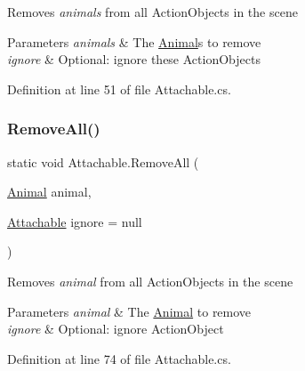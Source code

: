 Removes {\itshape animals}  from all Action\+Objects in the scene 


\begin{DoxyParams}{Parameters}
{\em animals} & The \mbox{\hyperlink{class_animal}{Animal}}s to remove\\
\hline
{\em ignore} & Optional\+: ignore these Action\+Objects\\
\hline
\end{DoxyParams}


Definition at line 51 of file Attachable.\+cs.

\mbox{\label{class_attachable_a2431a3ad3f6a1a2a4d697e6cc661d55c}} 
\subsubsection{\texorpdfstring{Remove\+All()}{RemoveAll()}\hspace{0.1cm}{\footnotesize\ttfamily [2/3]}}
{\footnotesize\ttfamily static void Attachable.\+Remove\+All (\begin{DoxyParamCaption}\item[{\mbox{\hyperlink{class_animal}{Animal}}}]{animal,  }\item[{\mbox{\hyperlink{class_attachable}{Attachable}}}]{ignore = {\ttfamily null} }\end{DoxyParamCaption})\hspace{0.3cm}{\ttfamily [static]}}



Removes {\itshape animal}  from all Action\+Objects in the scene 


\begin{DoxyParams}{Parameters}
{\em animal} & The \mbox{\hyperlink{class_animal}{Animal}} to remove\\
\hline
{\em ignore} & Optional\+: ignore Action\+Object\\
\hline
\end{DoxyParams}


Definition at line 74 of file Attachable.\+cs.

\mbox{\label{class_attachable_a3b2ed27cc6ed8d9548b8fc6256a24c19}} 
